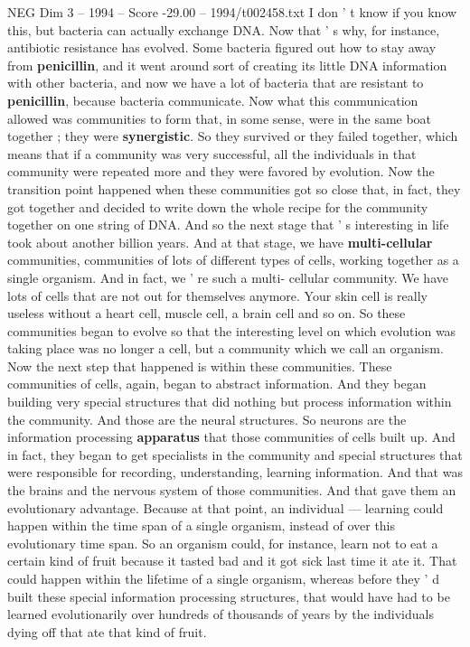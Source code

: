 \begin{textsample}{NEG Dim 3 – 1994 – Score -29.00 – 1994/t002458.txt}
I don ' t know if you know this, but bacteria can actually exchange DNA.
Now that ' s why, for instance, antibiotic resistance has evolved.
Some bacteria figured out how to stay away from \textbf{penicillin}, and it went around sort of creating its little DNA information with other bacteria, and now we have a lot of bacteria that are resistant to \textbf{penicillin}, because bacteria communicate.
Now what this communication allowed was communities to form that, in some sense, were in the same boat together ; they were \textbf{synergistic}.
So they survived or they failed together, which means that if a community was very successful, all the individuals in that community were repeated more and they were favored by evolution.
Now the transition point happened when these communities got so close that, in fact, they got together and decided to write down the whole recipe for the community together on one string of DNA.
And so the next stage that ' s interesting in life took about another billion years.
And at that stage, we have \textbf{multi-cellular} communities, communities of lots of different types of cells, working together as a single organism.
And in fact, we ' re such a multi- cellular community.
We have lots of cells that are not out for themselves anymore.
Your skin cell is really useless without a heart cell, muscle cell, a brain cell and so on.
So these communities began to evolve so that the interesting level on which evolution was taking place was no longer a cell, but a community which we call an organism.
Now the next step that happened is within these communities.
These communities of cells, again, began to abstract information.
And they began building very special structures that did nothing but process information within the community.
And those are the neural structures.
So neurons are the information processing \textbf{apparatus} that those communities of cells built up.
And in fact, they began to get specialists in the community and special structures that were responsible for recording, understanding, learning information.
And that was the brains and the nervous system of those communities.
And that gave them an evolutionary advantage.
Because at that point, an individual — learning could happen within the time span of a single organism, instead of over this evolutionary time span.
So an organism could, for instance, learn not to eat a certain kind of fruit because it tasted bad and it got sick last time it ate it.
That could happen within the lifetime of a single organism, whereas before they ' d built these special information processing structures, that would have had to be learned evolutionarily over hundreds of thousands of years by the individuals dying off that ate that kind of fruit.

\end{textsample}

